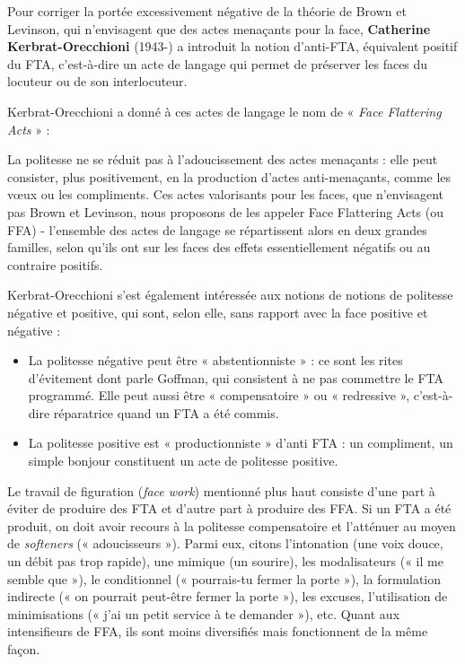 Pour corriger la portée excessivement négative de la théorie de Brown et Levinson, qui n’envisagent que des actes menaçants pour la face, \textbf{Catherine Kerbrat-Orecchioni} (1943-) a introduit la notion d’anti-FTA, équivalent positif du FTA, c’est-à-dire un acte de langage qui permet de préserver les faces du locuteur ou de son interlocuteur.

Kerbrat-Orecchioni a donné à ces actes de langage le nom de « \textit{Face Flattering Acts} » :
\begin{lecture}{}
La politesse ne se réduit pas à l’adoucissement des actes menaçants : elle peut consister, plus positivement, en la production d’actes anti-menaçants, comme les vœux ou les compliments. Ces actes valorisants pour les faces, que n’envisagent pas Brown et Levinson, nous proposons de les appeler Face Flattering Acts (ou FFA) - l’ensemble des actes de langage se répartissent alors en deux grandes familles, selon qu’ils ont sur les faces des effets essentiellement négatifs ou au contraire positifs.
\end{lecture}
Kerbrat-Orecchioni s’est également intéressée aux notions de notions de politesse négative et positive, qui sont, selon elle, sans rapport avec la face positive et négative :
\begin{itemize}
\item La politesse négative peut être « abstentionniste » : ce sont les rites d’évitement dont parle Goffman, qui consistent à ne pas commettre le FTA programmé. Elle peut aussi être « compensatoire » ou « redressive », c’est-à-dire réparatrice quand un FTA a été commis.
\item La politesse positive est « productionniste » d’anti FTA : un compliment, un simple bonjour constituent un acte de politesse positive.
\end{itemize}

Le travail de figuration (\textit{face work}) mentionné plus haut consiste d’une part à éviter de produire des FTA et d’autre part à produire des FFA. Si un FTA a été produit, on doit avoir recours à la politesse compensatoire et l’atténuer au moyen de \textit{softeners} (« adoucisseurs »). Parmi eux, citons l’intonation (une voix douce, un débit pas trop rapide), une mimique (un sourire), les modalisateurs (« il me semble que »), le conditionnel (« pourrais-tu fermer la porte »), la formulation indirecte (« on pourrait peut-être fermer la porte »), les excuses, l’utilisation de minimisations (« j’ai un petit service à te demander »), etc. Quant aux intensifieurs de FFA, ils sont moins diversifiés mais fonctionnent de la même façon.

